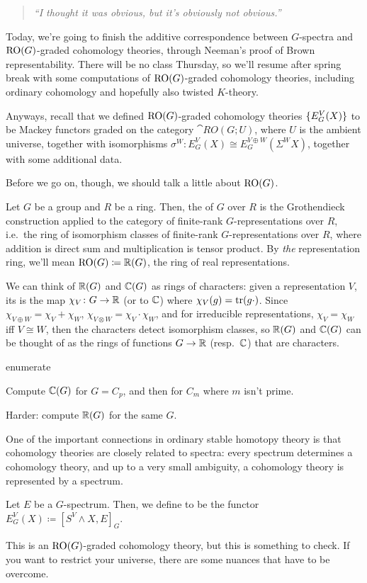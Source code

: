 \begin{quote}\textit{
	``I thought it was obvious, but it's obviously not obvious.''
}\end{quote}
Today, we're going to finish the additive correspondence between $G$-spectra and $\mathrm{RO}(G)$-graded cohomology
theories, through Neeman's proof of Brown representability. There will be no class Thursday, so we'll resume after
spring break with some computations of $\mathrm{RO}(G)$-graded cohomology theories, including ordinary cohomology and
hopefully also twisted $K$-theory.

Anyways, recall that we defined $\mathrm{RO}(G)$-graded cohomology theories $\{E_G^V(X)\}$ to be Mackey functors graded
on the category $\cat{RO}(G;U)$, where $U$ is the ambient universe, together with isomorphisms $\sigma^W\colon
E_G^V(X)\cong E_G^{V\oplus W}(\Sigma^W X)$, together with some additional data.

Before we go on, though, we should talk a little about $\mathrm{RO}(G)$.
\begin{defn}
Let $G$ be a group and $R$ be a ring. Then, the  of $G$ over $R$ is the Grothendieck
construction applied to the category of finite-rank $G$-representations over $R$, i.e.\ the ring of isomorphism
classes of finite-rank $G$-representations over $R$, where addition is direct sum and multiplication is tensor
product. By \emph{the} representation ring, we'll mean $\mathrm{RO}(G)\coloneqq\mathbb R(G)$, the ring of real representations.
\end{defn}
We can think of $\mathbb R(G)$ and $\mathbb C(G)$ as rings of characters: given a representation $V$, its  is the
map $\chi_V\colon G\to\mathbb R$ (or to $\mathbb C$) where $\chi_V(g) = \operatorname{tr}(g\cdot)$. Since $\chi_{V\oplus W} = \chi_V + \chi_W$,
$\chi_{V\otimes W} = \chi_V\cdot\chi_W$, and for irreducible representations, $\chi_V = \chi_W$ iff $V\cong W$,
then the characters detect isomorphism classes, so $\mathbb R(G)$ and $\mathbb C(G)$ can be thought of as the rings of functions
$G\to\mathbb R$ (resp.\ $\mathbb C$) that are characters.
\begin{comp}{ex}{enumerate}
	\item Compute $\mathbb C(G)$ for $G = C_p$, and then for $C_m$ where $m$ isn't prime.
	\item Harder: compute $\mathbb R(G)$ for the same $G$.
\end{comp}
One of the important connections in ordinary stable homotopy theory is that cohomology theories are closely related
to spectra: every spectrum determines a cohomology theory, and up to a very small ambiguity, a cohomology theory is
represented by a spectrum.
\begin{defn}
Let $E$ be a $G$-spectrum. Then, we define  to be the functor $E_G^V(X)\coloneqq [S^V\wedge X,
E]_G$.
\end{defn}
This is an $\mathrm{RO}(G)$-graded cohomology theory, but this is something to check. If you want to restrict your
universe, there are some nuances that have to be overcome.

